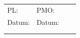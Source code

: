 \begin{table}[H]
{\begin{tabular}{lllllll}
\multicolumn{2}{l}{PL:}                                                                                                                                                          & PMO:                                                                                                 &                         & \multicolumn{3}{l}{}                                                                                                                                                                                                                                                                                                                                                                                                                                        \\
\multicolumn{2}{l}{Datum:}                                                                                                                                                       & Datum:                                                                                               &                         & \multicolumn{3}{l}{}                                                                                                                                                                                                                                                                                                                                                                                                                                        \\ \cline{1-3} \cline{5-7}
\multicolumn{7}{l}{}                                                                                                                                                                                                                                                                                                                                                                                                                                                                                                                                                                                                                                                                                                                                                            \\
\multicolumn{7}{l}{\multirow{-2}{*}{}}                                                                                                                                                                                                                                                                                                                                                                                                                                                                                                                                                                                                                                                                                                                                          \\

\end{tabular}}
\end{table}
